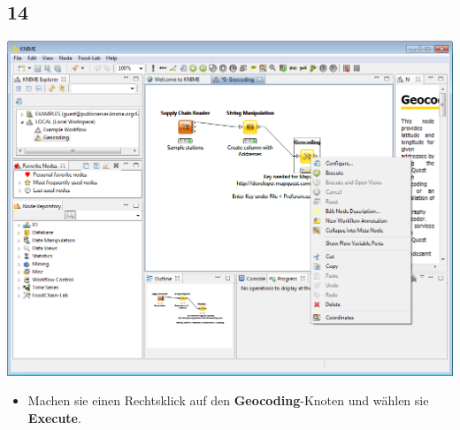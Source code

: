 \documentclass{beamer}
\begin{document}
\subsection{14}
\begin{frame}
	\begin{center}
  		\includegraphics[height=0.6\textheight]{14.png}
	\end{center}
	\begin{itemize}
		\item Machen sie einen Rechtsklick auf den \textbf{Geocoding}-Knoten und wählen sie \textbf{Execute}.
	\end{itemize}
\end{frame}
\end{document}
